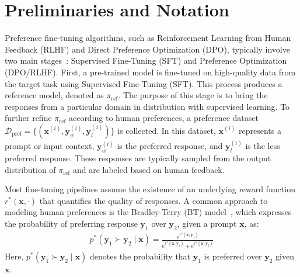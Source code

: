 \vspace{-0.15cm}
\section{Preliminaries and Notation}
\label{sec:background}
\vspace{-0.15cm}

Preference fine-tuning algorithms, such as Reinforcement Learning from Human Feedback (RLHF) and Direct Preference Optimization (DPO), typically involve two main stages~\citep{ouyang2022training,2022arXiv220302155O}: Supervised Fine-Tuning (SFT) and Preference Optimization (DPO/RLHF). First, a pre-trained model is fine-tuned on high-quality data from the target task using Supervised Fine-Tuning (SFT). This process produces a reference model, denoted as $\pi_{\text{ref}}$. The purpose of this stage is to bring the responses from a particular domain in distribution with supervised learning. To further refine $\pi_{\text{ref}}$ according to human preferences, a preference dataset $\mathcal{D}_{\text{pref}} = \{(\mathbf{x}^{(i)}, \mathbf{y}_w^{(i)}, \mathbf{y}_l^{(i)})\}$ is collected. In this dataset, $\mathbf{x}^{(i)}$ represents a prompt or input context, $\mathbf{y}_w^{(i)}$ is the preferred response, and $\mathbf{y}_l^{(i)}$ is the less preferred response. These responses are typically sampled from the output distribution of $\pi_{\text{ref}}$ and are labeled based on human feedback.

Most fine-tuning pipelines assume the existence of an underlying reward function $r^*(\mathbf{x}, \cdot)$ that quantifies the quality of responses. A common approach to modeling human preferences is the Bradley-Terry (BT) model~\citep{bradleyterry1952preferences}, which expresses the probability of preferring response $\mathbf{y}_1$ over $\mathbf{y}_2$, given a prompt $\mathbf{x}$, as:
\begin{align}
\label{eq:bradley_terry}
p^*(\mathbf{y}_1 \succ \mathbf{y}_2 \mid \mathbf{x}) = \frac{e^{r^*(\mathbf{x}, \mathbf{y}_1)}}{e^{r^*(\mathbf{x}, \mathbf{y}_1)} + e^{r^*(\mathbf{x}, \mathbf{y}_2)}}
\end{align}
Here, $p^*(\mathbf{y}_1 \succ \mathbf{y}_2 \mid \mathbf{x})$ denotes the probability that $\mathbf{y}_1$ is preferred over $\mathbf{y}_2$ given $\mathbf{x}$.

